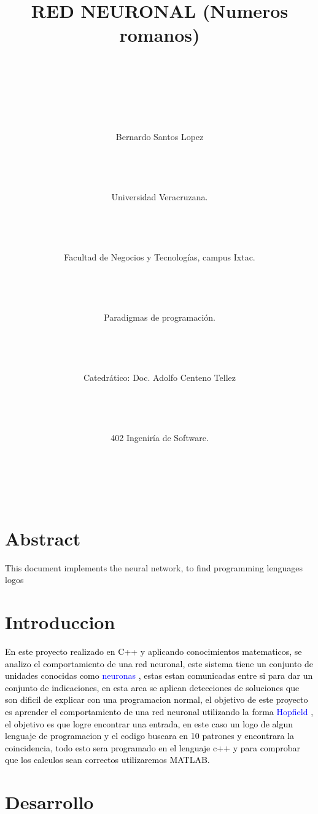 ﻿\documentclass[10pt]{article} %
\title{RED NEURONAL (Numeros romanos) \\ \\ \\ \\}
\author{Bernardo Santos Lopez  \\ \\ \\ \\ \\ Universidad Veracruzana.  \\ \\ \\ \\ \\ Facultad de Negocios y Tecnologías, campus Ixtac.  \\ \\ \\ \\ \\ Paradigmas de programación. \\ \\ \\ \\ \\Catedrático: Doc. Adolfo Centeno Tellez \\ \\ \\ \\ \\
402 Ingeniría de Software. \\ \\ \\ \\ \\ }
\begin{document}
 
\maketitle


 
 
 


\section{Abstract}


This document implements the neural network, to find programming lenguages logos



\section{Introduccion}

 
\textcolor{black}{En este proyecto realizado en C++ y aplicando conocimientos matematicos, se analizo el comportamiento de una red neuronal, este sistema tiene un conjunto de unidades conocidas como} \textcolor{blue}{neuronas} \textcolor{black}{, estas estan comunicadas entre si para dar un conjunto de indicaciones, en esta area se aplican detecciones de soluciones que son dificil de explicar con una programacion normal, el objetivo de este proyecto es aprender el comportamiento de una red neuronal utilizando la forma} \textcolor{blue}{Hopfield} \textcolor{black}{, el objetivo es que logre encontrar una entrada, en este caso un logo de algun lenguaje de programacion y el codigo buscara en 10 patrones y encontrara la coincidencia, todo esto sera programado en el lenguaje c++ y para comprobar que los calculos sean correctos utilizaremos MATLAB.} \\


 
\section{Desarrollo}
\end{document}
